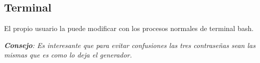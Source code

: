 \documentclass[12pt,a4paper]{report}
\begin{document}
\subsection*{Terminal}
El propio usuario la puede modificar con los procesos normales de terminal bash.

\vspace{1em}

\begin{tcolorbox}[colback=blue!5!white,colframe=blue!75!black]
\textit{\textbf{Consejo}: Es interesante que para evitar confusiones las tres contraseñas sean las mismas que es como lo deja el generador.}
\end{tcolorbox}
\end{document}

